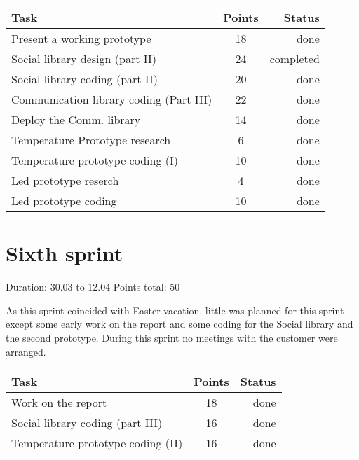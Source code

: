 \begin{table}[ht!]
\begin{tabular}{ | l | c | r | }

\hline
\textbf{Task} & \textbf{Points} & \textbf{Status} \\
\hline

Present a working prototype				& 18 & done \\
\hline
Social library design (part II)			& 24 & completed \\
\hline
Social library coding (part II)			& 20 & done \\
\hline
Communication library coding (Part III)	& 22 & done \\
\hline
Deploy the Comm. library				& 14 & done \\
\hline
Temperature Prototype research			& 6  & done \\
\hline
Temperature prototype coding (I)		& 10 & done \\
\hline
Led prototype reserch					& 4  & done \\
\hline
Led prototype coding					& 10 & done \\
\hline

\end{tabular}
\end{table}

\newpage

\section{Sixth sprint}

Duration: 30.03 to 12.04
Points total: 50

As this sprint coincided with Easter vacation, little
was planned for this sprint except some early work on the report
and some coding for the Social library and the second prototype.
During this sprint no meetings with the customer were arranged.

\begin{table}[ht!]
\begin{tabular}{ | l | c | r | }

\hline
\textbf{Task} & \textbf{Points} & \textbf{Status} \\
\hline

Work on the report					& 18 & done \\
\hline
Social library coding (part III)	& 16 & done \\
\hline
Temperature prototype coding (II)	& 16 & done \\
\hline

\end{tabular}
\end{table}
